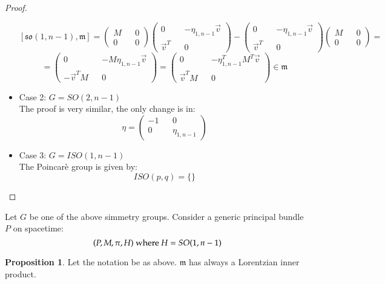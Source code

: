 \documentclass[12pt,a4paper]{report}
\theoremstyle{definition}
\theoremstyle{Theorem}
\newtheorem{Prop}[Def]{Proposition}
\theoremstyle{break}
\theoremstyle{definition}
\begin{document}
\begin{proof}
\begin{itemize}
			$$[\mathfrak{so}(1,n-1),\mathfrak{m}]=\begin{pmatrix}
				M && 0 \\
				0 && 0
			\end{pmatrix}\begin{pmatrix}
				0 && -\eta_{1,n-1}\vec{v} \\
				\vec{v}^T && 0
			\end{pmatrix}-\begin{pmatrix}
			0 && -\eta_{1,n-1}\vec{v} \\
			\vec{v}^T && 0
			\end{pmatrix}\begin{pmatrix}
			M && 0 \\
			0 && 0
			\end{pmatrix}=$$
			$$=\begin{pmatrix}
				0 && -M\eta_{1,n-1}\vec{v} \\
				-\vec{v}^TM && 0
			\end{pmatrix}=\begin{pmatrix}
			0 && -\eta_{1,n-1}^TM^T\vec{v} \\
			\vec{v}^TM && 0
			\end{pmatrix}\in\mathfrak{m}$$
			\item Case 2: $G=SO(2,n-1)$\\
			The proof is very similar, the only change is in:
			$$\eta=\begin{pmatrix}
				-1 && 0\\
				0 && \eta_{1,n-1}
			\end{pmatrix}$$
			\item Case 3: $G=ISO(1,n-1)$
			\\
			The Poincarè group is given by:
			$$ISO(p,q)=\{\}$$
		\end{itemize}
	\end{proof}
	Let $G$ be one of the above simmetry groups. Consider a generic principal bundle $P$ on spacetime:
	$$(P,M,\pi,H)\hbox{ where }H=SO(1,n-1)$$
	\begin{Prop}Let the notation be as above.
		$\mathfrak{m}$ has always a Lorentzian inner product.
	\end{Prop}
\end{document}
